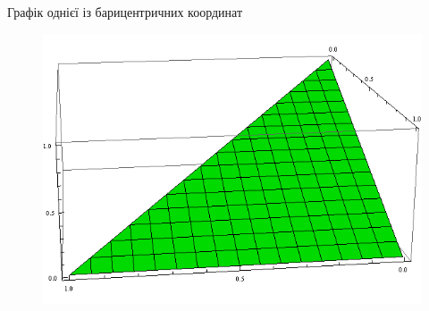 \begin{frame}{Графік однієї із барицентричних координат}
	\begin{figure}[H]
		\centering
	    \includegraphics[scale=0.5]{images/barycentric}
	    \label{fig:barycentric_coordinates}
	\end{figure}
\end{frame}
